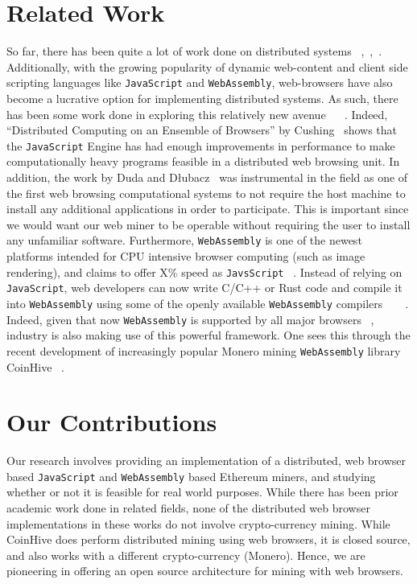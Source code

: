 \documentclass[10pt, conference, compsocconf]{IEEEtran}
\begin{document}
\section{Related Work}
So far, there has been quite a lot of work done on distributed systems ~\cite{scheduling},~\cite{parallel},~\cite{orca}. Additionally, with the growing popularity of dynamic web-content and client side scripting languages like \verb|JavaScript| and \verb|WebAssembly|, web-browsers have also become a lucrative option for implementing distributed systems. As such, there has been some work done in exploring this relatively new avenue ~\cite{WebFlow} ~\cite{Duda}. 
Indeed, ``Distributed Computing on an Ensemble of Browsers'' by Cushing~\cite{Cushing} shows that the \verb|JavaScript| Engine has had enough improvements in performance to make computationally heavy programs feasible in a distributed web browsing unit. In addition, the work by Duda and Dłubacz~\cite{Duda} was instrumental in the field as one of the first web browsing computational systems to not require the host machine to install any additional applications in order to participate. This is important since we would want our web miner to be operable without requiring the user to install any unfamiliar software. Furthermore, \verb|WebAssembly| is one of the newest platforms intended for CPU intensive browser computing (such as image rendering), and claims to offer X\% speed as \verb|JavsScript| ~\cite{WebAssembly}. Instead of relying on \verb|JavaScript|, web developers can now write C/C++ or Rust code and compile it into \verb|WebAssembly| using some of the openly available \verb|WebAssembly| compilers ~\cite{emscripten} ~\cite{rustCompiler} . Indeed, given that now \verb|WebAssembly| is supported by all major browsers ~\cite{webasmSupport}, industry is also making use of this powerful framework. One sees this through the recent development of increasingly popular Monero mining \verb|WebAssembly| library CoinHive ~\cite{coinhive}.

\section{Our Contributions}
Our research involves providing an implementation of a distributed, web browser based \verb|JavaScript| and \verb|WebAssembly| based Ethereum miners, and studying whether or not it is feasible for real world purposes. While there has been prior academic work done in related fields, none of the distributed web browser implementations in these works do not involve crypto-currency mining. While CoinHive does perform distributed mining using web browsers, it is closed source, and also works with a different crypto-currency (Monero). Hence, we are pioneering in offering an open source architecture for mining with web browsers.
\end{document}

